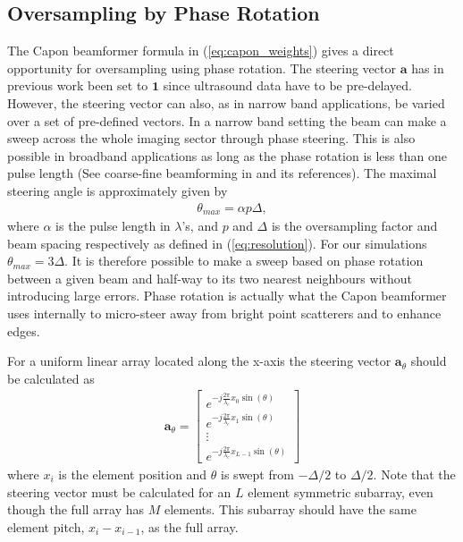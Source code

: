 \documentclass[draftcls]{IEEEtran}
\renewcommand{\vec}[1]{\mathbf{#1}}
\begin{document}
\subsection{Oversampling by Phase Rotation}
The Capon beamformer formula in (\ref{eq:capon_weights}) gives a direct opportunity for oversampling using phase rotation. The steering vector $\vec{a}$ has in previous work been set to $\vec{1}$ since ultrasound data have to be pre-delayed. However, the steering vector can also, as in narrow band applications, be varied over a set of pre-defined vectors. In a narrow band setting the beam can make a sweep across the whole imaging sector through phase steering. This is also possible in broadband applications as long as the phase rotation is less than one pulse length (See coarse-fine beamforming in \cite{Thomenius} and its references). The maximal steering angle is approximately given by
\begin{align}
\theta_{max} = \alpha p \Delta,
\end{align}
where $\alpha$ is the pulse length in $\lambda$'s, and $p$ and $\Delta$ is the oversampling factor and beam spacing respectively as defined in (\ref{eq:resolution}). For our simulations $\theta_{max} = 3\Delta$.
It is therefore possible to make a sweep based on phase rotation between a given beam and half-way to its two nearest neighbours without introducing large errors. Phase rotation is actually what the Capon beamformer uses internally to micro-steer away from bright point scatterers and to enhance edges.

For a uniform linear array located along the x-axis the steering vector $\vec{a}_\theta$ should be calculated as 
\begin{align}
\vec{a}_\theta = 
\begin{bmatrix}
e^{-j\frac{2\pi}{\lambda_c}x_0\sin(\theta)} \\
e^{-j\frac{2\pi}{\lambda_c}x_1\sin(\theta)} \\
\vdots \\ 
e^{-j\frac{2\pi}{\lambda_c}x_{L-1}\sin(\theta)}
\end{bmatrix}
\end{align}
where $x_i$ is the element position and $\theta$ is swept from $-\Delta/2$ to $\Delta/2$. Note that the steering vector must be calculated for an $L$ element symmetric subarray, even though the full array has $M$ elements. This subarray should have the same element pitch, $x_i - x_{i-1}$, as the full array. %
\end{document}
